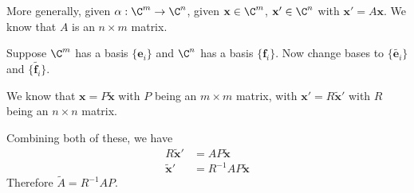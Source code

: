 \documentclass[a4paper]{article}
\begin{document}
More generally, given $\alpha: \C^m \to \C^n$, given $\mathbf{x}\in \C^m$, $\mathbf{x}'\in \C^n$ with $\mathbf{x}' = A\mathbf{x}$. We know that $A$ is an $n\times m$ matrix.

Suppose $\C^m$ has a basis $\{\mathbf{e}_i\}$ and $\C^n$ has a basis $\{\mathbf{f}_i\}$. Now change bases to $\{\tilde{\mathbf{e}_i}\}$ and $\{\tilde{\mathbf{f}_i}\}$.

We know that $\mathbf{x} = P\mathbf{\tilde{x}}$ with $P$ being an $m\times m$ matrix, with $\mathbf{x}' = R\tilde{\mathbf{x}}'$ with $R$ being an $n\times n$ matrix.

Combining both of these, we have
\begin{align*}
  R\tilde{\mathbf{x}}' &= AP\tilde{\mathbf{x}}\\
  \tilde{\mathbf{x}}' &= R^{-1}AP\mathbf{\tilde{x}}
\end{align*}
Therefore $\tilde{A} = R^{-1}AP$.
\end{document}
